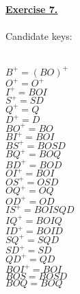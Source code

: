 \documentclass[12pt]{article}
\begin{document}
\newpage
\noindent \hyperlink{toc}{\hypertarget{7}{\LARGE \underline{\textbf{Exercise 7.}}}}\\\\
Candidate keys:\\\\
\begin{minipage}[t]{0.5\textwidth} %
    $B^+ = (BO)^+$\\
    $O^+ = O^+$\\
    $I^+ = BOI$\\
    $S^+ = SD$\\
    $Q^+ = Q$\\
    $D^+ = D$\\
    $BO^+ = BO$\\
    $BI^+ = BOI$\\
    $BS^+ = BOSD$\\
    $BQ^+ = BOQ$\\
    $BD^+ = BOD$\\
    $OI^+ = BOI$\\
    $OS^+ = OSD$\\
    $OQ^+ = OQ$\\
    $OD^+ = OD$\\
    $IS^+ = BOISQD$\\
    $IQ^+ = BOIQ$\\
    $ID^+ = BOID$\\
    $SQ^+ = SQD$\\
    $SD^+ = SD$\\
    $QD^+ = QD$\\
    $BOI^+ = BOI$\\
    $BOS = BOSD$ \\
    $BOQ = BOQ$ \\

\end{minipage}
\end{document}
